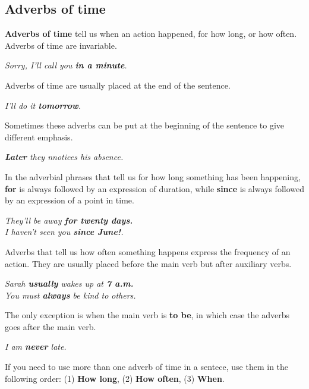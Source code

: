 \documentclass[hidelinks,10pt,a4paper]{article}
\begin{document}
\subsection{Adverbs of time}
\textbf{Adverbs of time} tell us when an action happened, for how long, or how often.
Adverbs of time are invariable.

\begin{center}
	\textit{Sorry, I'll call you \textbf{in a minute}.}
\end{center}

Adverbs of time are usually placed at the end of the sentence.

\begin{center}
	\textit{I'll do it \textbf{tomorrow}.}
\end{center}

Sometimes these adverbs can be put at the beginning of the sentence to give different emphasis.

\begin{center}
	\textit{\textbf{Later} they nnotices his absence.}
\end{center}

In the adverbial phrases that tell us for how long something has been happening, \textbf{for} is always followed by an expression of duration, while \textbf{since} is always followed by an expression of a point in time.

\begin{center}
	\textit{They'll be away \textbf{for twenty days.}}\\
	\textit{I haven't seen you \textbf{since June!}.}
\end{center}

Adverbs that tell us how often something happens express the frequency of an action. They are usually placed before the main verb but after auxiliary verbs.

\begin{center}
	\textit{Sarah \textbf{usually} wakes up at \textbf{7 a.m.}\\
	You must \textbf{always} be kind to others.}
\end{center}

The only exception is when the main verb is \textbf{to be}, in which case the adverbs goes after the main verb.

\begin{center}
	\textit{I am \textbf{never} late.}
\end{center}

If you need to use more than one adverb of time in a sentece, use them in the following order: (1) \textbf{How long}, (2) \textbf{How often}, (3) \textbf{When}.
\end{document}
